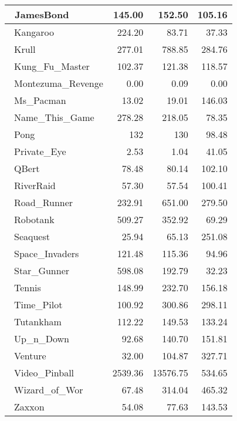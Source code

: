 \documentclass{article}
\begin{document}
\begin{table*}[h]
\begin{tabular}{l|r|r|r}
		\hline\
		JamesBond & 145.00 & 152.50 & 105.16 \\
		\hline\
		Kangaroo & 224.20 & 83.71 & 37.33 \\
		\hline\
		Krull & 277.01 & 788.85 & 284.76 \\
		\hline\
		Kung\_Fu\_Master & 102.37 & 121.38 & 118.57 \\
		\hline\
		Montezuma\_Revenge & 0.00 & 0.09 & 0.00 \\
		\hline\
		Ms\_Pacman & 13.02 & 19.01 & 146.03 \\
		\hline\
		Name\_This\_Game & 278.28 & 218.05 & 78.35 \\
		\hline\
		Pong & 132 & 130 & 98.48 \\
		\hline\
		Private\_Eye & 2.53 & 1.04 & 41.05 \\
		\hline\
		QBert & 78.48 & 80.14 & 102.10 \\
		\hline\
		RiverRaid & 57.30 & 57.54 & 100.41 \\
		\hline\
		Road\_Runner & 232.91 & 651.00 & 279.50 \\
		\hline\
		Robotank & 509.27 & 352.92 & 69.29 \\
		\hline\
		Seaquest & 25.94 & 65.13 & 251.08 \\
		\hline\
		Space\_Invaders & 121.48 & 115.36 & 94.96 \\
		\hline\
		Star\_Gunner & 598.08 & 192.79 & 32.23 \\
		\hline\
		Tennis & 148.99 & 232.70 & 156.18 \\
		\hline\
		Time\_Pilot & 100.92 & 300.86 & 298.11 \\
		\hline\
		Tutankham & 112.22 & 149.53 & 133.24 \\
		\hline\
		Up\_n\_Down & 92.68 & 140.70 & 151.81 \\
		\hline\
		Venture & 32.00 & 104.87 & 327.71 \\
		\hline\
		Video\_Pinball & 2539.36 & 13576.75 & 534.65 \\
		\hline\
		Wizard\_of\_Wor & 67.48 & 314.04 & 465.32 \\
		\hline\
		Zaxxon & 54.08 & 77.63 & 143.53 \\
		\hline
	\end{tabular}
\end{table*}
\end{document}
